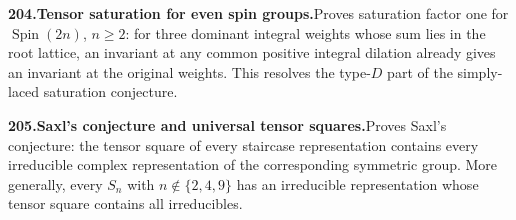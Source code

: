 \documentclass[11pt,a4paper]{article}
\begin{document}
  \par \begin{minipage}{\linewidth}
  \fontsize{10.5}{12.6}\selectfont\RaggedRight
  \hypertarget{result 204}{}
  {\bfseries\textcolor{muted}{204.}\enspace Tensor saturation for even spin groups.}\enspace Proves saturation factor one for $\operatorname{Spin}(2n)$, $n\ge2$: for three dominant integral weights whose sum lies in the root lattice, an invariant at any common positive integral dilation already gives an invariant at the original weights. This resolves the type-$D$ part of the simply-laced saturation conjecture.\par
  \end{minipage}\par\vspace{5pt}



  \par \begin{minipage}{\linewidth}
  \fontsize{10.5}{12.6}\selectfont\RaggedRight
  \hypertarget{result 205}{}
  {\bfseries\textcolor{muted}{205.}\enspace Saxl's conjecture and universal tensor squares.}\enspace Proves Saxl's conjecture: the tensor square of every staircase representation contains every irreducible complex representation of the corresponding symmetric group. More generally, every $S_n$ with $n\notin\{2,4,9\}$ has an irreducible representation whose tensor square contains all irreducibles.\par
  \end{minipage}\par\vspace{5pt}
\end{document}
